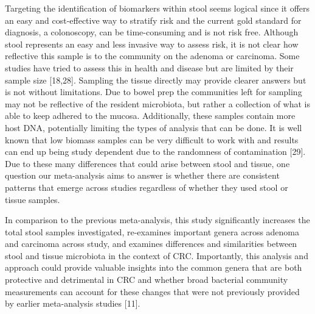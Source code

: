 \documentclass[12pt,]{article}
\begin{document}
Targeting the identification of biomarkers within stool seems logical
since it offers an easy and cost-effective way to stratify risk and the
current gold standard for diagnosis, a colonoscopy, can be
time-consuming and is not risk free. Although stool represents an easy
and less invasive way to assess risk, it is not clear how reflective
this sample is to the community on the adenoma or carcinoma. Some
studies have tried to assess this in health and disease but are limited
by their sample size {[}18,28{]}. Sampling the tissue directly may
provide clearer answers but is not without limitations. Due to bowel
prep the communities left for sampling may not be reflective of the
resident microbiota, but rather a collection of what is able to keep
adhered to the mucosa. Additionally, these samples contain more host
DNA, potentially limiting the types of analysis that can be done. It is
well known that low biomass samples can be very difficult to work with
and results can end up being study dependent due to the randomness of
contamination {[}29{]}. Due to these many differences that could arise
between stool and tissue, one question our meta-analysis aims to answer
is whether there are consistent patterns that emerge across studies
regardless of whether they used stool or tissue samples.

In comparison to the previous meta-analysis, this study significantly
increases the total stool samples investigated, re-examines important
genera across adenoma and carcinoma across study, and examines
differences and similarities between stool and tissue microbiota in the
context of CRC. Importantly, this analysis and approach could provide
valuable insights into the common genera that are both protective and
detrimental in CRC and whether broad bacterial community measurements
can account for these changes that were not previously provided by
earlier meta-analysis studies {[}11{]}.
\end{document}
